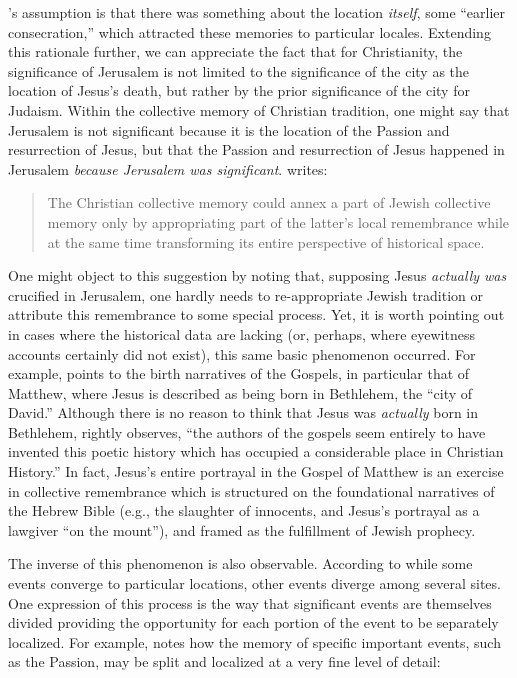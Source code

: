 \halbwachs's assumption is that there was something about the location \emph{itself}, some ``earlier consecration,''\autocite[220]{halbwachs1992} which attracted these memories to particular locales. Extending this rationale further, we can appreciate the fact that for Christianity, the significance of Jerusalem is not limited to the significance of the city as the location of Jesus's death, but rather by the prior significance of the city for Judaism. Within the collective memory of Christian tradition, one might say that Jerusalem is not significant because it is the location of the Passion and resurrection of Jesus, but that the Passion and resurrection of Jesus happened in Jerusalem \emph{because Jerusalem was significant}. \halbwachs writes:  

\begin{quote} The Christian collective memory could annex a part of Jewish collective memory only by appropriating part of the latter's local remembrance while at the same time transforming its entire perspective of historical space.\autocite[215]{halbwachs1992} \end{quote}  

One might object to this suggestion by noting that, supposing Jesus \emph{actually was} crucified in Jerusalem, one hardly needs to re-appropriate Jewish tradition or attribute this remembrance to some special process. Yet, it is worth pointing out in cases where the historical data are lacking (or, perhaps, where eyewitness accounts certainly did not exist), this same basic phenomenon occurred. For example, \halbwachs points to the birth narratives of the Gospels, in particular that of Matthew, where Jesus is described as being born in Bethlehem, the ``city of David.'' Although there is no reason to think that Jesus was \emph{actually} born in Bethlehem, \halbwachs rightly observes, ``the authors of the gospels seem entirely to have invented this poetic history which has occupied a considerable place in Christian History.''\autocite[214]{halbwachs1992} In fact, Jesus's entire portrayal in the Gospel of Matthew is an exercise in collective remembrance which is structured on the foundational narratives of the Hebrew Bible (e.g., the slaughter of innocents, and Jesus's portrayal as a lawgiver ``on the mount''), and framed as the fulfillment of Jewish prophecy.  

The inverse of this phenomenon is also observable. According to \halbwachs while some events converge to particular locations, other events diverge among several sites. One expression of this process is the way that significant events are themselves divided providing the opportunity for each portion of the event to be separately localized. For example, \halbwachs notes how the memory of specific important events, such as the Passion, may be split and localized at a very fine level of detail:  


